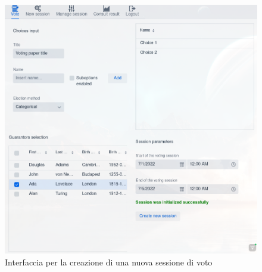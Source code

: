 \begin{figure}
	\centering
	\includegraphics[width=\textwidth]{img/gui/newSession.png}
	\caption{Interfaccia per la creazione di una nuova sessione di voto}
	\label{screenshot:newsession}
\end{figure}

